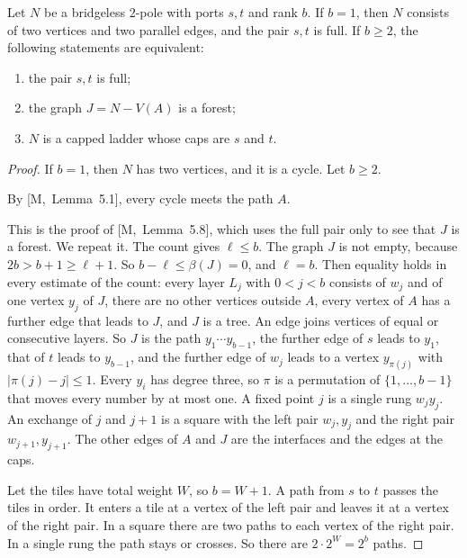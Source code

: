 \documentclass[11pt]{article}
\newcommand{\M}[1]{[M,~#1]}
\begin{document}
\begin{lemma}[Ladders]\label{lem:ladders}
Let $N$ be a bridgeless $2$-pole with ports $s,t$ and rank $b$. If $b=1$, then $N$ consists of two
vertices and two parallel edges, and the pair $s,t$ is full. If $b\ge2$, the following statements
are equivalent:
\begin{enumerate}
\item[\textup{(i)}] the pair $s,t$ is full;
\item[\textup{(ii)}] the graph $J=N-V(A)$ is a forest;
\item[\textup{(iii)}] $N$ is a capped ladder whose caps are $s$ and $t$.
\end{enumerate}
\end{lemma}

\begin{proof}
If $b=1$, then $N$ has two vertices, and it is a cycle. Let $b\ge2$.

 By \M{Lemma~5.1}, every cycle meets the path $A$.

 This is the proof of \M{Lemma~5.8}, which uses the
full pair only to see that $J$ is a forest. We repeat it. The count gives $\ell\le b$. The graph
$J$ is not empty, because $2b>b+1\ge\ell+1$. So $b-\ell\le\beta(J)=0$, and $\ell=b$. Then equality
holds in every estimate of the count: every layer $L_j$ with $0<j<b$ consists of $w_j$ and of one
vertex $y_j$ of $J$, there are no other vertices outside $A$, every vertex of $A$ has a further
edge that leads to $J$, and $J$ is a tree. An edge joins vertices of equal or consecutive layers.
So $J$ is the path $y_1\cdots y_{b-1}$, the further edge of $s$ leads to $y_1$, that of $t$ leads
to $y_{b-1}$, and the further edge of $w_j$ leads to a vertex $y_{\pi(j)}$ with
$|\pi(j)-j|\le1$. Every $y_i$ has degree three, so $\pi$ is a permutation of $\{1,\dots,b-1\}$
that moves every number by at most one. A fixed point $j$ is a single rung $w_jy_j$. An exchange
of $j$ and $j+1$ is a square with the left pair $w_j,y_j$ and the right pair $w_{j+1},y_{j+1}$.
The other edges of $A$ and $J$ are the interfaces and the edges at the caps.

 Let the tiles have total weight $W$, so $b=W+1$. A path
from $s$ to $t$ passes the tiles in order. It enters a tile at a vertex of the left pair and
leaves it at a vertex of the right pair. In a square there are two paths to each vertex of the
right pair. In a single rung the path stays or crosses. So there are $2\cdot2^{W}=2^{b}$ paths.
\end{proof}
\end{document}
